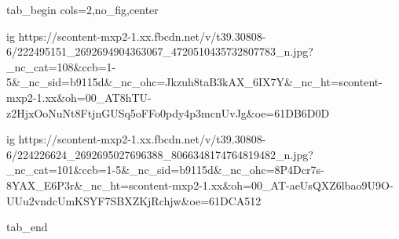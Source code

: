  
 
 
 
 

\ifcmt
tab_begin cols=2,no_fig,center

  ig https://scontent-mxp2-1.xx.fbcdn.net/v/t39.30808-6/222495151_2692694904363067_4720510435732807783_n.jpg?_nc_cat=108&ccb=1-5&_nc_sid=b9115d&_nc_ohc=Jkzuh8taB3kAX_6IX7Y&_nc_ht=scontent-mxp2-1.xx&oh=00_AT8hTU-z2HjxOoNuNt8FtjnGUSq5oFFo0pdy4p3mcnUvJg&oe=61DB6D0D

  ig https://scontent-mxp2-1.xx.fbcdn.net/v/t39.30808-6/224226624_2692695027696388_8066348174764819482_n.jpg?_nc_cat=101&ccb=1-5&_nc_sid=b9115d&_nc_ohc=8P4Dcr7s-8YAX_E6P3r&_nc_ht=scontent-mxp2-1.xx&oh=00_AT-aeUsQXZ6lbao9U9O-UUu2vndcUmKSYF7SBXZKjRchjw&oe=61DCA512

tab_end
\fi
